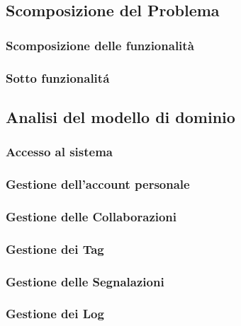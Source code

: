 \documentclass{article}
\begin{document}
\subsection{Scomposizione del Problema}
\subsubsection{Scomposizione delle funzionalità}

\subsubsection{Sotto funzionalitá}


\subsection{Analisi del modello di dominio}
\subsubsection{Accesso al sistema}

\subsubsection{Gestione dell'account personale}

\subsubsection{Gestione delle Collaborazioni}

\subsubsection{Gestione dei Tag}

\subsubsection{Gestione delle Segnalazioni}

\subsubsection{Gestione dei Log}

\end{document}
